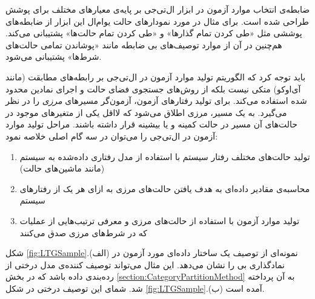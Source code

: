 ضابطه‌‌ی انتخاب موارد آزمون در ابزار ال‌تی‌جی بر پایه‌ی معیارهای مختلف برای پوشش طراحی شده است. برای مثال در مورد نمودارهای حالت یو‌ام‌ال این ابزار از ضابطه‌های پوششی مثل «طی کردن تمام گذارها» و «طی کردن تمام حالت‌ها» پشتیبانی می‌کند. هم‌چنین در آن از موارد توصیف‌های بی ضابطه‌ مانند «پوشاندن تمامی حالت‌های شرط‌ها» پشتیبانی می‌شود.

باید توجه کرد که الگوریتم تولید موارد آزمون در ال‌تی‌جی بر رابطه‌های مطابقت (مانند آی‌او‌کو) متکی نیست بلکه از روش‌های جستجوی فضای حالت و اجرای نمادین محدود شده استفاده می‌کند. برای تولید رفتارهای آزمون، آزمون‌گر مسیرهای \emph{مرزی} را در نظر می‌گیرد. به یک مسیر، مرزی اطلاق می‌شود که لااقل یکی از متغیرهای موجود در حالت‌های آن مسیر در حالت کمینه و یا بیشینه قرار داشته باشند. مراحل تولید موارد آزمون در ال‌تی‌جی را می‌توان در سه گام اصلی خلاصه نمود:
\begin{enumerate}
\item تولید حالت‌های مختلف رفتار سیستم با استفاده از مدل رفتاری داده‌شده به سیستم (مانند ماشین‌های حالت)
\item محاسبه‌ی مقادیر داده‌ای به هدف یافتن حالت‌های مرزی به ازای هر یک از رفتارهای سیستم
\item تولید موارد آزمون با استفاده از حالت‌های مرزی و معرفی ترتیب‌هایی از عملیات که در شرط‌های مرزی صدق می‌کنند
\end{enumerate}
شکل \ref{fig:LTGSample}.(الف) نمونه‌ای از توصیف یک ساختار داده‌ای مورد آزمون در نمادگذاری بی را نشان می‌دهد. این مثال می‌تواند توصیف کننده‌ی مدل درختی از رده‌بندی داده‌ باشد که در بخش \ref{section:CategoryPartitionMethod} به آن پرداخته شد. شمای این توصیف درختی در شکل \ref{fig:LTGSample}.(ب) آمده است.
 
